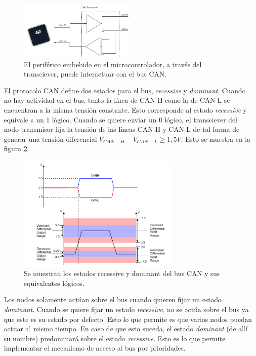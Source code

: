 \begin{figure}[H]
    \centering
    \includegraphics[width=0.5\textwidth]{img/microcontrolador_transciever.png}    
    \caption{El periférico embebido en el microcontrolador, a través del transciever, puede interactuar con el bus CAN.}
    \label{fig:microcontrolador_transciever}
\end{figure}

El protocolo CAN define dos estados para el bus, \textit{recessive} y \textit{dominant}. Cuando no hay actividad en el bus, tanto la línea de CAN-H como la de CAN-L se encuentran a la misma tensión constante. Esto corresponde al estado \textit{recessive} y equivale a un 1 lógico. Cuando se quiere enviar un 0 lógico, el transciever del nodo transmisor fija la tensión de las líneas CAN-H y CAN-L de tal forma de generar una tensión diferencial $V_{CAN-H} - V_{CAN-L} \geq 1,5 V$. Esto se muestra en la figura \ref{fig:CAN_recessive_dominant}.

\begin{figure}[H]
    \centering
    \includegraphics[width=0.7\textwidth]{img/CAN_recessive_dominant.png}
    \caption{Se muestran los estados recessive y dominant del bus CAN y sus equivalentes lógicos.}
    \label{fig:CAN_recessive_dominant}    
\end{figure}

Los nodos solamente actúan sobre el bus cuando quieren fijar un estado \textit{dominant}. Cuando se quiere fijar un estado \textit{recessive}, no se actúa sobre el bus ya que este es su estado por defecto. Esto lo que permite es que varios nodos puedan actuar al mismo tiempo. En caso de que esto suceda, el estado \textit{dominant} (de allí su nombre) predominará sobre el estado \textit{recessive}. Esto es lo que permite implementar el mecanismo de acceso al bus por prioridades.\\

